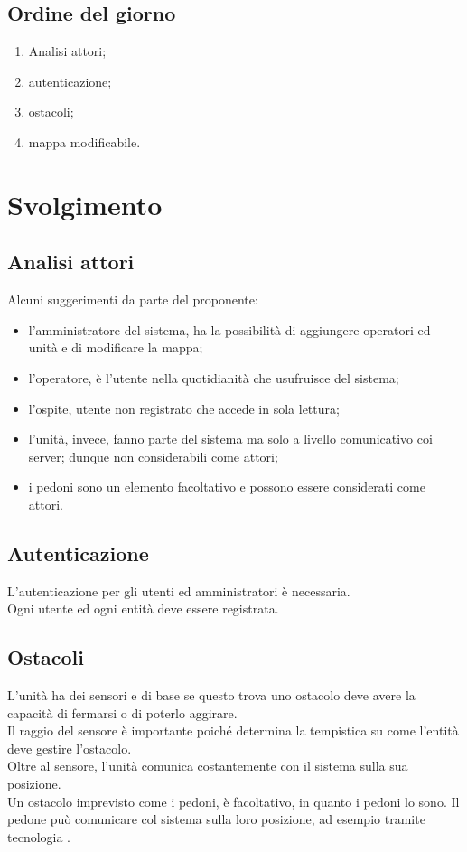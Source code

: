 \documentclass[]{article}
\begin{document}
		\subsection{Ordine del giorno}
		\begin{enumerate}
			\item Analisi attori;
			\item autenticazione;
			\item ostacoli;
			\item mappa modificabile.
		\end{enumerate}
\newpage	
	\section{Svolgimento}
		\subsection{Analisi attori}
		Alcuni suggerimenti da parte del proponente:
		\begin{itemize}
			\item l'amministratore del sistema, ha la possibilità di aggiungere operatori ed unità e di modificare la mappa;
			\item l'operatore, è l'utente nella quotidianità che usufruisce del sistema;
			\item l'ospite, utente non registrato che accede in sola lettura;
			\item l'unità, invece, fanno parte del sistema ma solo a livello comunicativo coi server; dunque non considerabili come attori;
			\item i pedoni sono un elemento facoltativo e possono essere considerati come attori.
		\end{itemize}
		
	
		\subsection{Autenticazione}
		L'autenticazione per gli utenti ed amministratori è necessaria. \\
		Ogni utente ed ogni entità deve essere registrata.
			
		\subsection{Ostacoli}
		L'unità ha dei sensori e di base se questo trova uno ostacolo deve avere la capacità di fermarsi o di poterlo aggirare. \\
		Il raggio del sensore è importante poiché determina la tempistica su come l'entità deve gestire l'ostacolo.\\
		Oltre al sensore, l'unità comunica costantemente con il sistema sulla sua posizione. \\
		Un ostacolo imprevisto come i pedoni, è facoltativo, in quanto i pedoni lo sono.
		Il pedone può comunicare col sistema sulla loro posizione, ad esempio tramite tecnologia .
		
\end{document}
